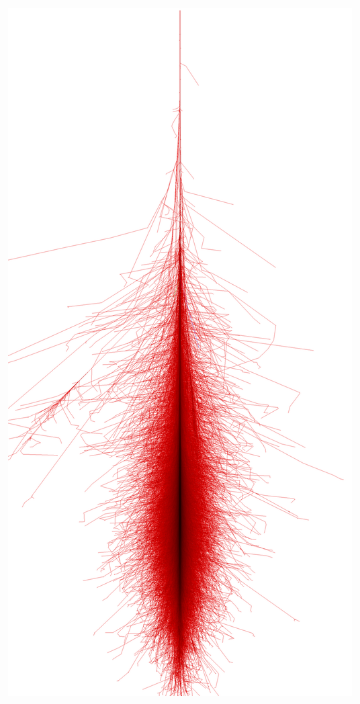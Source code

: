 \begin{figure}
	\centering
	\begin{subfigure}{.5\textwidth}
  		\centering
  		\includegraphics[width=.9\linewidth]{images/corsika_1tev_photon.png}
	\end{subfigure}%
	\begin{subfigure}{.5\textwidth}
 		\centering

\end{subfigure}
\end{figure}
